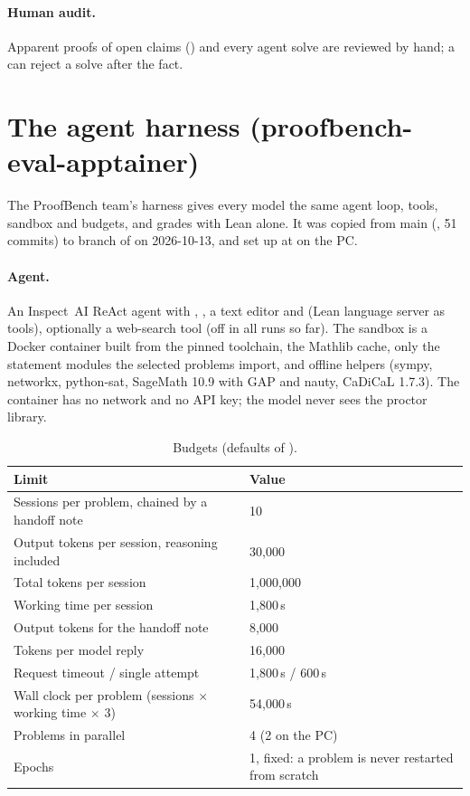\documentclass[11pt,a4paper]{article}
\begin{document}
\paragraph{Human audit.} Apparent proofs of open claims () and every agent solve are reviewed by hand; a  can reject a solve after the fact.

\section{The agent harness (proofbench-eval-apptainer)}
\label{sec:harness}

The ProofBench team's harness gives every model the same agent loop, tools, sandbox and budgets, and grades with Lean alone. It was copied from  main (, 51 commits) to branch  of  on 2026-10-13, and set up at  on the PC.

\paragraph{Agent.} An Inspect~AI \cite{inspect} ReAct \cite{yao2023} agent with , , a text editor and  (Lean language server as tools), optionally a web-search tool (off in all runs so far). The sandbox is a Docker container built from the pinned toolchain, the Mathlib cache, only the statement modules the selected problems import, and offline helpers (sympy, networkx, python-sat, SageMath 10.9 with GAP and nauty, CaDiCaL 1.7.3). The container has no network and no API key; the model never sees the proctor library.

\begin{table}[htbp]
\centering\small
\caption{Budgets (defaults of ).}
\label{tab:budgets}
\begin{tabular}{L{100mm}L{40mm}}
\toprule
Limit & Value \\
\midrule
Sessions per problem, chained by a handoff note & 10 \\
Output tokens per session, reasoning included & 30,000 \\
Total tokens per session & 1,000,000 \\
Working time per session & 1,800\,s \\
Output tokens for the handoff note & 8,000 \\
Tokens per model reply & 16,000 \\
Request timeout / single attempt & 1,800\,s / 600\,s \\
Wall clock per problem (sessions $\times$ working time $\times$ 3) & 54,000\,s \\
Problems in parallel & 4 (2 on the PC) \\
Epochs & 1, fixed: a problem is never restarted from scratch \\
\bottomrule
\end{tabular}
\end{table}
\end{document}
